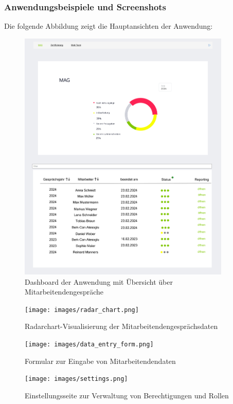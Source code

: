 \subsubsection*{Anwendungsbeispiele und Screenshots}
Die folgende Abbildung zeigt die Hauptansichten der Anwendung:

\begin{figure}[H]
    \centering
    \includegraphics[width=0.9\textwidth]{images/dashboard.png}
    \caption{Dashboard der Anwendung mit Übersicht über Mitarbeitendengespräche}
    \label{fig:dashboard}
\end{figure}

\begin{figure}[H]
    \centering
    \texttt{[image: images/radar\_chart.png]}
    \caption{Radarchart-Visualisierung der Mitarbeitendengesprächsdaten}
    \label{fig:radar_chart}
\end{figure}

\begin{figure}[H]
    \centering
    \texttt{[image: images/data\_entry\_form.png]}
    \caption{Formular zur Eingabe von Mitarbeitendendaten}
    \label{fig:data_entry}
\end{figure}

\begin{figure}[H]
    \centering
    \texttt{[image: images/settings.png]}
    \caption{Einstellungsseite zur Verwaltung von Berechtigungen und Rollen}
    \label{fig:settings}
\end{figure}

